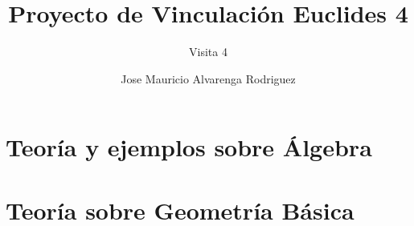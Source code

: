 \documentclass[9pt]{beamer}
\title{Proyecto de Vinculación Euclides 4
}
\subtitle{Visita 4}
\author{\inst{1}Jose Mauricio Alvarenga Rodriguez}
\institute{\inst{1} Universidad Nacional Autónoma de Honduras}
\begin{document}
\begin{frame}
\titlepage
\end{frame}
\section[Teoría Álgebra]{Teoría y ejemplos sobre Álgebra}
{

}
{

}
{

}
\section[Teoría Geometría]{Teoría sobre Geometría Básica}
{

}
{

}
\end{document}
